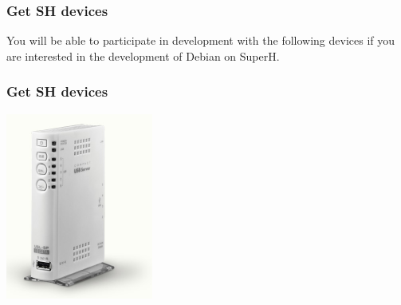 \documentclass[cjk,dvipdfmx,12pt]{beamer}
\begin{document}
\begin{frame}
 \frametitle{Get SH devices}
You will be able to participate in development with the following devices if you are interested in the development of Debian on SuperH. 

\end{frame}



\begin{frame}
 \frametitle{Get SH devices}
 \begin{minipage}[t]{0.3\hsize}
  \includegraphics[width=1.0\hsize]{image200705/usl5p.png}
 \end{minipage} 
 \begin{minipage}[t]{0.3\hsize}

\end{minipage}
\end{frame}
\end{document}
